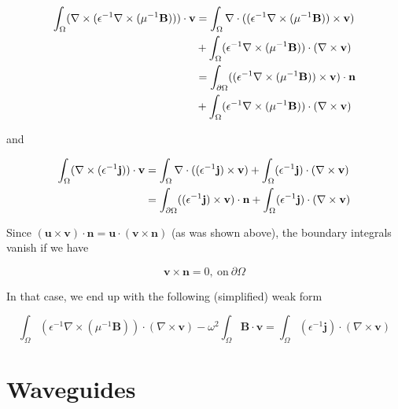 \documentclass[11pt, a4paper]{article}
\begin{document}
\begin{align}
    \int_{\Omega} (\nabla \times (\epsilon^{-1} \nabla \times (\mu^{-1} \mathbf{B}))) \cdot \mathbf{v}
    &= \int_{\Omega} \nabla \cdot ((\epsilon^{-1} \nabla \times (\mu^{-1} \mathbf{B})) \times \mathbf{v}) \notag \\ 
    &+ \int_{\Omega} (\epsilon^{-1} \nabla \times (\mu^{-1} \mathbf{B})) \cdot (\nabla \times \mathbf{v}) \notag \\ 
    &= \int_{\partial \Omega} ((\epsilon^{-1} \nabla \times (\mu^{-1} \mathbf{B})) \times \mathbf{v}) \cdot \mathbf{n} \notag \\ 
    &+ \int_{\Omega} (\epsilon^{-1} \nabla \times (\mu^{-1} \mathbf{B})) \cdot (\nabla \times \mathbf{v}) \notag \\ 
\end{align}

and 

\begin{align}
    \int_{\Omega} (\nabla \times (\epsilon^{-1} \mathbf{j})) \cdot \mathbf{v}
    &= \int_{\Omega} \nabla \cdot ((\epsilon^{-1} \mathbf{j}) \times \mathbf{v})
    + \int_{\Omega} (\epsilon^{-1} \mathbf{j}) \cdot (\nabla \times \mathbf{v}) \notag \\ 
    &= \int_{\partial \Omega} ((\epsilon^{-1} \mathbf{j}) \times \mathbf{v}) \cdot \mathbf{n}
    + \int_{\Omega} (\epsilon^{-1} \mathbf{j}) \cdot (\nabla \times \mathbf{v})
\end{align}

Since $(\mathbf{u} \times \mathbf{v}) \cdot \mathbf{n} = \mathbf{u} \cdot (\mathbf{v} \times \mathbf{n})$
(as was shown above), the boundary integrals vanish if we have

\begin{equation}
    \mathbf{v} \times \mathbf{n} = 0, ~\text{on}~\partial\Omega
\end{equation}

In that case, we end up with the following (simplified) weak form

\begin{equation}
    \int_{\Omega} (\epsilon^{-1} \nabla \times (\mu^{-1} \mathbf{B})) \cdot (\nabla \times \mathbf{v})
    - \omega^2 \int_{\Omega} \mathbf{B} \cdot \mathbf{v}
    = \int_{\Omega} (\epsilon^{-1} \mathbf{j}) \cdot (\nabla \times \mathbf{v})
\end{equation}

\section{Waveguides}
\label{sec:waveguides}
\end{document}
